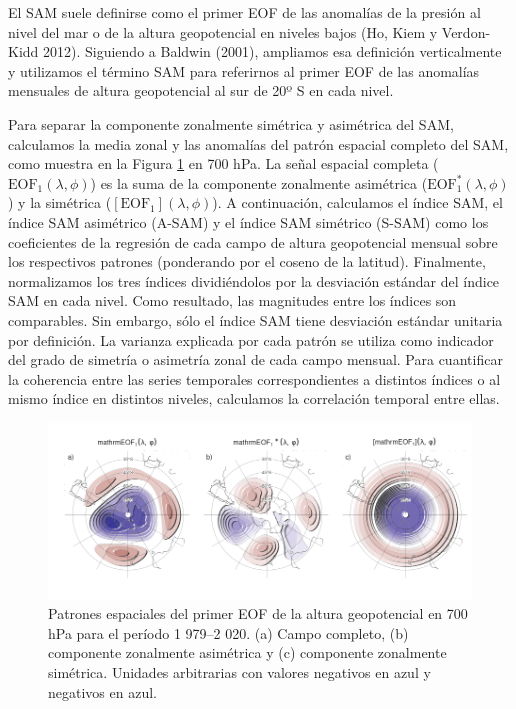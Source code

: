 \documentclass[12pt,oneside,a4paper]{reedthesis}
\begin{document}
El SAM suele definirse como el primer EOF de las anomalías de la presión al nivel del mar o de la altura geopotencial en niveles bajos (Ho, Kiem y Verdon-Kidd 2012).
Siguiendo a Baldwin (2001), ampliamos esa definición verticalmente y utilizamos el término SAM para referirnos al primer EOF de las anomalías mensuales de altura geopotencial al sur de 20º S en cada nivel.

Para separar la componente zonalmente simétrica y asimétrica del SAM, calculamos la media zonal y las anomalías del patrón espacial completo del SAM, como muestra en la Figura \ref{fig:method} en 700 hPa.
La señal espacial completa (\(\mathrm{EOF_1}(\lambda, \phi)\)) es la suma de la componente zonalmente asimétrica (\(\mathrm{EOF_1^*}(\lambda, \phi)\)) y la simétrica (\([\mathrm{EOF_1}](\lambda, \phi)\)).
A continuación, calculamos el índice SAM, el índice SAM asimétrico (A-SAM) y el índice SAM simétrico (S-SAM) como los coeficientes de la regresión de cada campo de altura geopotencial mensual sobre los respectivos patrones (ponderando por el coseno de la latitud).
Finalmente, normalizamos los tres índices dividiéndolos por la desviación estándar del índice SAM en cada nivel.
Como resultado, las magnitudes entre los índices son comparables.
Sin embargo, sólo el índice SAM tiene desviación estándar unitaria por definición.
La varianza explicada por cada patrón se utiliza como indicador del grado de simetría o asimetría zonal de cada campo mensual.
Para cuantificar la coherencia entre las series temporales correspondientes a distintos índices o al mismo índice en distintos niveles, calculamos la correlación temporal entre ellas.



\begin{figure}

{\centering \includegraphics{figures/30-sam/method-1} 

}

\caption{Patrones espaciales del primer EOF de la altura geopotencial en 700 hPa para el período 1 979--2 020. (a) Campo completo, (b) componente zonalmente asimétrica y (c) componente zonalmente simétrica. Unidades arbitrarias con valores negativos en azul y negativos en azul.}\label{fig:method}
\end{figure}
\end{document}
